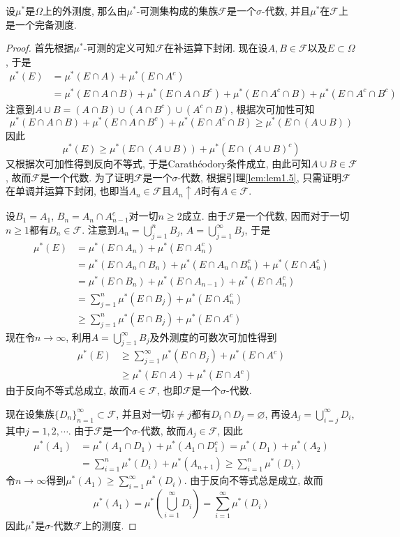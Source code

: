 \documentclass[cn, 12pt, math=mtpro2, bibstyle=apa, blue, twocol]{elegantbook}
\newcommand{\F}{\mathcal{F}}
\let\emptyset\varnothing
\begin{document}
\begin{theorem}\label{thm:thm1.15}
  设$\mu^\ast$是$\Omega$上的外测度, 那么由$\mu^\ast$-可测集构成的集族$\mathcal{F}$是一个$\sigma$-代数, 并且$\mu^\ast$在$\F$上是一个完备测度.
\end{theorem}
\begin{proof}
  首先根据$\mu^\ast$-可测的定义可知$\F$在补运算下封闭. 现在设$A,B\in\F$以及$E\subset\Omega$, 于是
  \begin{align*}
  \mu^\ast(E)&=\mu^\ast(E\cap A)+\mu^\ast(E\cap A^c) \\
  &=\mu^\ast(E\cap A\cap B)+\mu^\ast(E\cap A\cap B^c)+\mu^\ast(E\cap A^c\cap B)+\mu^\ast(E\cap A^c\cap B^c)
  \end{align*}
  注意到$A\cup B=(A\cap B)\cup (A\cap B^c)\cup(A^c\cap B)$, 根据次可加性可知
  $$\mu^\ast(E\cap A\cap B)+\mu^\ast(E\cap A\cap B^c)+\mu^\ast(E\cap A^c\cap B)\geq \mu^\ast(E\cap (A\cup B))$$
  因此
  $$\mu^\ast(E)\geq\mu^\ast(E\cap (A\cup B))+\mu^\ast(E\cap(A\cup B)^c)$$
  又根据次可加性得到反向不等式, 于是Carathéodory条件成立, 由此可知$A\cup B\in\F$, 故而$\F$是一个代数. 为了证明$\F$是一个$\sigma$-代数, 根据引理\ref{lem:lem1.5}, 只需证明$\F$在单调并运算下封闭, 也即当$A_n\in\F$且$A_n\uparrow A$时有$A\in\F$.

  设$B_1=A_1$, $B_n=A_n\cap A_{n-1}^c$对一切$n\ge2$成立. 由于$\F$是一个代数, 因而对于一切$n\ge1$都有$B_n\in\F$. 注意到$A_n=\bigcup_{j=1}^nB_j$, $A=\bigcup_{j=1}^\infty B_j$, 于是
  \begin{align*}
  \mu^\ast(E)&=\mu^\ast(E\cap A_n)+\mu^\ast(E\cap A_n^c) \\
  &=\mu^\ast(E\cap A_n\cap B_n)+\mu^\ast(E\cap A_n\cap B_n^c)+\mu^\ast(E\cap A_n^c) \\
  &=\mu^\ast(E\cap B_n)+\mu^\ast(E\cap A_{n-1})+\mu^\ast(E\cap A_n^c) \\
  &=\sum_{j=1}^{n}\mu^\ast(E\cap B_j)+\mu^\ast(E\cap A_n^c)\\
  &\geq\sum_{j=1}^{n}\mu^\ast(E\cap B_j)+\mu^\ast(E\cap A^c)
  \end{align*}
  现在令$n\to\infty$, 利用$A=\bigcup_{j=1}^\infty B_j$及外测度的可数次可加性得到
  \begin{align*}
  \mu^\ast(E)&\geq \sum_{j=1}^{\infty}\mu^\ast(E\cap B_j)+\mu^\ast(E\cap A^c) \\
  &\geq \mu^\ast(E\cap A)+\mu^\ast(E\cap A^c)
  \end{align*}
  由于反向不等式总成立, 故而$A\in\F$, 也即$\F$是一个$\sigma$-代数.

  现在设集族$\{D_n\}_{n=1}^\infty\subset\F$, 并且对一切$i\neq j$都有$D_i\cap D_j=\emptyset$, 再设$A_j=\bigcup_{i=j}^\infty D_i$, 其中$j=1,2,\cdots$. 由于$\F$是一个$\sigma$-代数, 故而$A_j\in\F$, 因此
  \begin{align*}
  \mu^\ast(A_1)&=\mu^\ast(A_1\cap D_1)+\mu^\ast(A_1\cap D_1^c)=\mu^\ast(D_1)+\mu^\ast(A_2) \\
  &=\sum_{i=1}^{n}\mu^\ast(D_i)+\mu^\ast(A_{n+1})\geq\sum_{i=1}^{n}\mu^\ast(D_i)
  \end{align*}
  令$n\to\infty$得到$\mu^\ast(A_1)\geq \sum_{i=1}^{\infty}\mu^\ast(D_i)$. 由于反向不等式总是成立, 故而
  $$\mu^\ast(A_1)=\mu^\ast\left(\bigcup_{i=1}^\infty D_i\right)=\sum_{i=1}^{\infty}\mu^\ast(D_i)$$
  因此$\mu^\ast$是$\sigma$-代数$\F$上的测度.


\end{proof}
\end{document}
